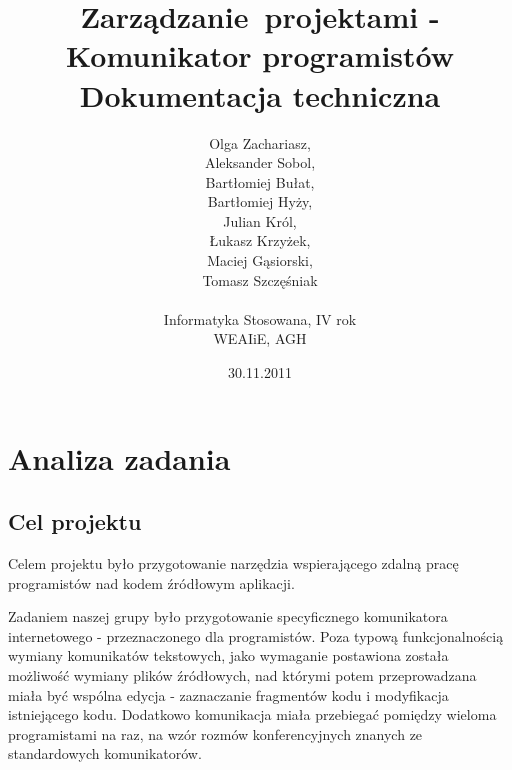 \documentclass[polish,11pt,a4paper,twoside]{article}
\begin{document}
\pagestyle{fancy}
\fancyhf{} %
\fancyfoot[R]{\footnotesize \thepage}
\renewcommand{\headrulewidth}{0pt}
\renewcommand{\footrulewidth}{0pt}

\author{Olga Zachariasz,\\Aleksander Sobol,\\Bartłomiej Bułat,\\Bartłomiej Hyży,\\Julian Król,\\Łukasz Krzyżek,\\Maciej Gąsiorski,\\Tomasz Szczęśniak\\\\Informatyka Stosowana, IV rok\\WEAIiE, AGH}
\date{30.11.2011}
\title{Zarządzanie~projektami - Komunikator programistów\\Dokumentacja techniczna}
\maketitle

\begin{spacing}{0.8}
\tableofcontents
\end{spacing}

\pagebreak

\thispagestyle{fancy}

\section{Analiza zadania}

\subsection{Cel projektu}

Celem projektu było przygotowanie narzędzia wspierającego zdalną pracę programistów nad kodem źródłowym aplikacji.

Zadaniem naszej grupy było przygotowanie specyficznego komunikatora internetowego - przeznaczonego dla programistów. Poza typową funkcjonalnością wymiany komunikatów tekstowych, jako wymaganie postawiona została możliwość wymiany plików źródłowych, nad którymi potem przeprowadzana miała być wspólna edycja - zaznaczanie fragmentów kodu i modyfikacja istniejącego kodu. Dodatkowo komunikacja miała przebiegać pomiędzy wieloma programistami na raz, na wzór rozmów konferencyjnych znanych ze standardowych komunikatorów.
\end{document}
